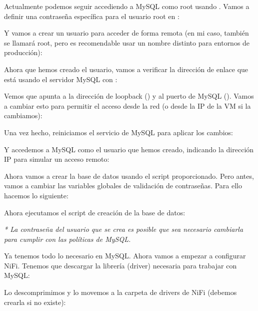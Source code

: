 \documentclass{../../../miPlantilla}
\begin{document}
Actualmente podemos seguir accediendo a MySQL como root usando . Vamos a definir una contraseña específica para el usuario root en :


Y vamos a crear un usuario para acceder de forma remota (en mi caso, también se llamará root, pero es recomendable usar un nombre distinto para entornos de producción):


Ahora que hemos creado el usuario, vamos a verificar la dirección de enlace que está usando el servidor MySQL con :


Vemos que apunta a la dirección de loopback () y al puerto de MySQL ().
Vamos a cambiar esto para permitir el acceso desde la red (o desde la IP de la VM si la cambiamos):


Una vez hecho, reiniciamos el servicio de MySQL para aplicar los cambios:


Y accedemos a MySQL como el usuario que hemos creado, indicando la dirección IP para simular un acceso remoto:


Ahora vamos a crear la base de datos usando el script proporcionado. Pero antes, vamos a cambiar las variables globales de validación de contraseñas. Para ello hacemos lo siguiente:


\newpage

Ahora ejecutamos el script de creación de la base de datos:


\textit{* La contraseña del usuario que se crea es posible que sea necesario cambiarla para cumplir con las políticas de MySQL.}


\newpage

Ya tenemos todo lo necesario en MySQL. Ahora vamos a empezar a configurar NiFi. Tenemos que descargar la librería (driver) necesaria para trabajar con MySQL:


Lo descomprimimos y lo movemos a la carpeta de drivers de NiFi (debemos crearla si no existe):

\end{document}
